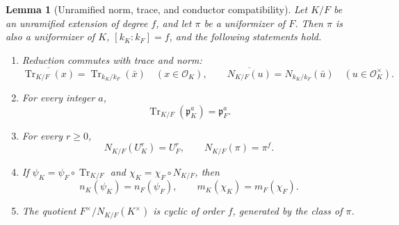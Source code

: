 \documentclass[11pt]{amsart}
\newtheorem{lemma}[theorem]{Lemma}
\theoremstyle{definition}
\theoremstyle{remark}
\newcommand{\cO}{\mathcal O}
\newcommand{\p}{\mathfrak p}
\newcommand{\Tr}{\operatorname{Tr}}
\begin{document}
\begin{lemma}[Unramified norm, trace, and conductor compatibility]
\label{lem:unramified-compatibility}
Let $K/F$ be an unramified extension of degree $f$, and let $\pi$ be a
uniformizer of $F$.  Then $\pi$ is also a uniformizer of $K$,
$[k_K:k_F]=f$, and the following statements hold.
\begin{enumerate}[label=(\alph*)]
\item Reduction commutes with trace and norm:
\begin{equation}\label{eq:unramified-residue-trace-norm}
 \overline{\Tr_{K/F}(x)}=\Tr_{k_K/k_F}(\bar x)
 \quad(x\in\cO_K),
 \qquad
 \overline{N_{K/F}(u)}=N_{k_K/k_F}(\bar u)
 \quad(u\in\cO_K^\times).
\end{equation}
\item For every integer $a$,
\begin{equation}\label{eq:unramified-trace-ideal}
 \Tr_{K/F}(\p_K^a)=\p_F^a.
\end{equation}
\item For every $r\geq0$,
\begin{equation}\label{eq:unramified-norm-units}
 N_{K/F}(U_K^r)=U_F^r,
 \qquad N_{K/F}(\pi)=\pi^f.
\end{equation}
\item If $\psi_K=\psi_F\circ\Tr_{K/F}$ and
$\chi_K=\chi_F\circ N_{K/F}$, then
\begin{equation}\label{eq:unramified-conductors}
 n_K(\psi_K)=n_F(\psi_F),
 \qquad m_K(\chi_K)=m_F(\chi_F).
\end{equation}
\item The quotient $F^\times/N_{K/F}(K^\times)$ is cyclic of order $f$,
generated by the class of $\pi$.
\end{enumerate}
\end{lemma}
\end{document}
